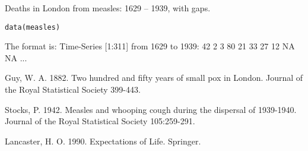 \begin{Description}\relax
Deaths in London from measles: 1629 -- 1939, with gaps.
\end{Description}
\begin{Usage}
\begin{verbatim}data(measles)\end{verbatim}
\end{Usage}
\begin{Format}\relax
The format is:
Time-Series [1:311] from 1629 to 1939: 42 2 3 80 21 33 27 12 NA NA ...
\end{Format}
\begin{Source}\relax
Guy, W. A. 1882. Two hundred and fifty years of small pox in London.
Journal of the Royal Statistical Society 399-443.

Stocks, P. 1942. Measles and whooping cough during the dispersal of 
1939-1940. Journal of the Royal Statistical Society 105:259-291.
\end{Source}
\begin{References}\relax
Lancaster, H. O. 1990. Expectations of Life. Springer.
\end{References}


